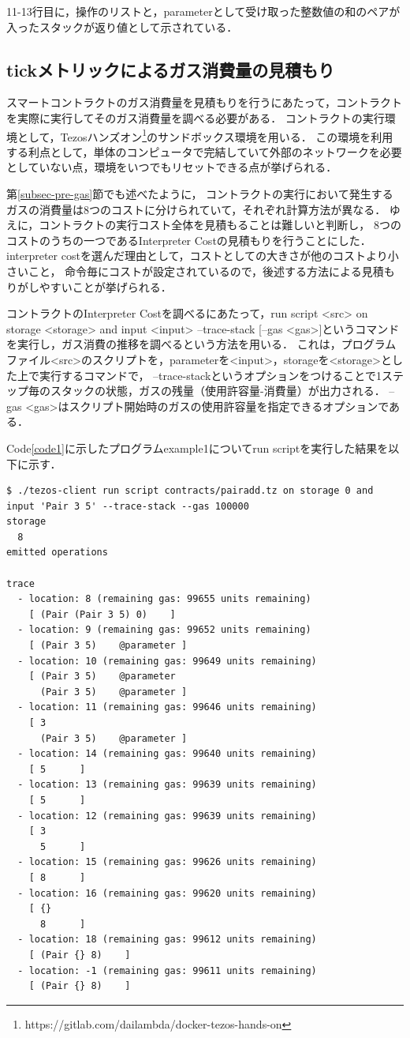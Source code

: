 \documentclass{kuisthesis}
\begin{document}
11-13行目に，操作のリストと，parameterとして受け取った整数値の和のペアが入ったスタックが返り値として示されている．


\subsection{tickメトリックによるガス消費量の見積もり} \label{subsec-pro-gas}
スマートコントラクトのガス消費量を見積もりを行うにあたって，コントラクトを実際に実行してそのガス消費量を調べる必要がある．
コントラクトの実行環境として，Tezosハンズオン\footnote{https://gitlab.com/dailambda/docker-tezos-hands-on}のサンドボックス環境を用いる．
この環境を利用する利点として，単体のコンピュータで完結していて外部のネットワークを必要としていない点，環境をいつでもリセットできる点が挙げられる．

第\ref{subsec-pre-gas}節でも述べたように，
コントラクトの実行において発生するガスの消費量は8つのコストに分けられていて，それぞれ計算方法が異なる．
ゆえに，コントラクトの実行コスト全体を見積もることは難しいと判断し，
8つのコストのうちの一つであるInterpreter Costの見積もりを行うことにした．
interpreter costを選んだ理由として，コストとしての大きさが他のコストより小さいこと，
命令毎にコストが設定されているので，後述する方法による見積もりがしやすいことが挙げられる．

コントラクトのInterpreter Costを調べるにあたって，run script <src> on storage <storage> and input <input> --trace-stack [--gas <gas>]というコマンドを実行し，ガス消費の推移を調べるという方法を用いる．
これは，プログラムファイル<src>のスクリプトを，parameterを<input>，storageを<storage>とした上で実行するコマンドで，
--trace-stackというオプションをつけることで1ステップ毎のスタックの状態，ガスの残量（使用許容量-消費量）が出力される．
--gas <gas>はスクリプト開始時のガスの使用許容量を指定できるオプションである．

Code\ref{code1}に示したプログラムexample1についてrun scriptを実行した結果を以下に示す．
\\

\begin{lstlisting}[basicstyle={\ttfamily\color{base}\scriptsize}]
$ ./tezos-client run script contracts/pairadd.tz on storage 0 and input 'Pair 3 5' --trace-stack --gas 100000
storage
  8
emitted operations
  
trace
  - location: 8 (remaining gas: 99655 units remaining)
    [ (Pair (Pair 3 5) 0)  	 ]
  - location: 9 (remaining gas: 99652 units remaining)
    [ (Pair 3 5)  	@parameter ]
  - location: 10 (remaining gas: 99649 units remaining)
    [ (Pair 3 5)  	@parameter
      (Pair 3 5)  	@parameter ]
  - location: 11 (remaining gas: 99646 units remaining)
    [ 3  	
      (Pair 3 5)  	@parameter ]
  - location: 14 (remaining gas: 99640 units remaining)
    [ 5  	 ]
  - location: 13 (remaining gas: 99639 units remaining)
    [ 5  	 ]
  - location: 12 (remaining gas: 99639 units remaining)
    [ 3  	
      5  	 ]
  - location: 15 (remaining gas: 99626 units remaining)
    [ 8  	 ]
  - location: 16 (remaining gas: 99620 units remaining)
    [ {}  	
      8  	 ]
  - location: 18 (remaining gas: 99612 units remaining)
    [ (Pair {} 8)  	 ]
  - location: -1 (remaining gas: 99611 units remaining)
    [ (Pair {} 8)  	 ]
\end{lstlisting}
\end{document}
